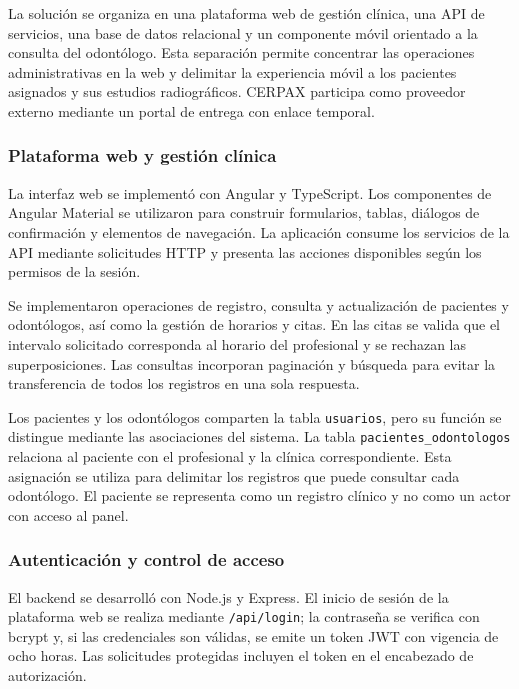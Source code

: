 
La solución se organiza en una plataforma web de gestión clínica, una API
de servicios, una base de datos relacional y un componente móvil orientado
a la consulta del odontólogo. Esta separación permite concentrar las
operaciones administrativas en la web y delimitar la experiencia móvil a
los pacientes asignados y sus estudios radiográficos. CERPAX participa como
proveedor externo mediante un portal de entrega con enlace temporal.

\subsubsection{Plataforma web y gestión clínica}

La interfaz web se implementó con Angular y TypeScript. Los componentes de
Angular Material se utilizaron para construir formularios, tablas,
diálogos de confirmación y elementos de navegación. La aplicación consume
los servicios de la API mediante solicitudes HTTP y presenta las acciones
disponibles según los permisos de la sesión.

Se implementaron operaciones de registro, consulta y actualización de
pacientes y odontólogos, así como la gestión de horarios y citas. En las
citas se valida que el intervalo solicitado corresponda al horario del
profesional y se rechazan las superposiciones. Las consultas incorporan
paginación y búsqueda para evitar la transferencia de todos los registros
en una sola respuesta.

Los pacientes y los odontólogos comparten la tabla \texttt{usuarios}, pero
su función se distingue mediante las asociaciones del sistema. La tabla
\texttt{pacientes\_odontologos} relaciona al paciente con el profesional y
la clínica correspondiente. Esta asignación se utiliza para delimitar los
registros que puede consultar cada odontólogo. El paciente se representa
como un registro clínico y no como un actor con acceso al panel.

\subsubsection{Autenticación y control de acceso}

El backend se desarrolló con Node.js y Express. El inicio de sesión de la
plataforma web se realiza mediante \texttt{/api/login}; la contraseña se
verifica con bcrypt y, si las credenciales son válidas, se emite un token
JWT con vigencia de ocho horas. Las solicitudes protegidas incluyen el
token en el encabezado de autorización.

